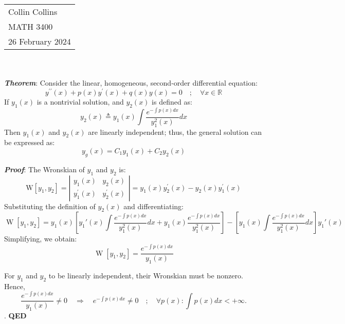 \documentclass[a4paper,12pt]{article} %
\begin{document}



\thispagestyle{empty} %

\begin{tabular}{p{15.5cm}} %
\\ Collin Collins \\
MATH 3400\\
26 February 2024 \\
\hline %

\end{tabular} 
\\
\\

\textbf{\textit{Theorem}}: Consider the linear, homogeneous, second-order differential equation:
$$
y^{\prime \prime}(x)+p(x) y^{\prime}(x)+q(x) y(x)=0\quad;\quad\forall x\in \mathbb{R}
$$
If $y_1(x)$ is a nontrivial solution, and $y_2(x)$ is defined as:
$$
y_2(x) \triangleq y_1(x) \int \frac{e^{-\int p(x) d x}}{y_1^2(x)} d x
$$
Then $y_1(x)$ and $y_2(x)$ are linearly independent; thus, the general solution can be expressed as:
$$
y_g(x)=C_1 y_1(x)+C_2 y_2(x)
$$

\textbf{\textit{Proof}}: The Wronskian of $y_1$ and $y_2$ is:
$$
\mathrm{W}\left[y_1, y_2\right]=\left|\begin{array}{ll}
y_1(x) & y_2(x) \\
y_1^{\prime}(x) & y_2^{\prime}(x)
\end{array}\right|=y_1(x) y_2^{\prime}(x)-y_2(x) y_1^{\prime}(x)
$$
Substituting the definition of $y_2(x)$ and differentiating:
$$ \operatorname{W}[y_1, y_2] = y_1(x)\left[y_1'(x)\int{\frac{e^{-\int p(x)dx}}{y_1^2(x)}}dx + y_1(x)\frac{e^{-\int p(x)dx}}{y_1^2(x)}\right] - \left[y_1(x)\int{\frac{e^{-\int p(x)dx}}{y_1^2(x)}}dx\right]y_1'(x)$$
Simplifying, we obtain:
$$ \operatorname{W}[y_1, y_2] = \frac{e^{-\int p(x)dx}}{y_1(x)}$$

For $y_1$ and $y_2$ to be linearly independent, their Wronskian must be nonzero. Hence,
$$
\frac{e^{-\int p(x) d x}}{y_1(x)} \neq 0 \quad \Longrightarrow \quad e^{-\int p(x) d x} \neq 0\quad;\quad\forall p(x): \int p(x) d x<+\infty.
$$.
\textbf{QED}
\end{document}
